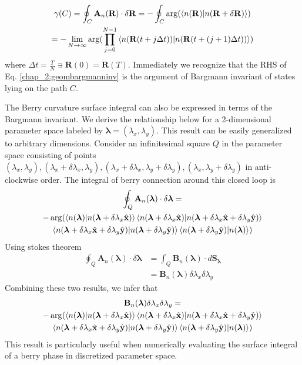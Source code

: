 \begin{multline}
 \label{chap_2:geombargmanninv}\gamma(C) = \oint_{C}{\mathbf{A}_{n}(\mathbf{R}) \cdot \delta\mathbf{R}}  = -\oint_{C}{\arg(\braket{n(\mathbf{R})|n(\mathbf{R} +\delta\mathbf{R})})} \\ = -\lim_{N\rightarrow\infty} \arg(\prod_{j=0}^{N-1}{\braket{n(\mathbf{R}(t + j\Delta t))|n(\mathbf{R}(t + (j+1)\Delta t))}})
\end{multline} where $\Delta t = \frac{T}{N} \ni \mathbf{R}(0)=\mathbf{R}(T)$.
Immediately we recognize that the RHS of Eq. \eqref{chap_2:geombargmanninv} is the argument of Bargmann invariant of states lying on the path $C$.

The Berry curvature surface integral can also be expressed in terms of the Bargmann invariant. We derive the relationship below for a 2-dimensional parameter space
labeled by $\bm{\lambda} = (\lambda_x, \lambda_y)$. This result can be easily generalized to arbitrary dimensions. Consider an infinitesimal square $Q$ in the parameter space 
consisting of points $(\lambda_x, \lambda_y), (\lambda_x + \delta\lambda_x, \lambda_y), (\lambda_x + \delta\lambda_x, \lambda_y + \delta\lambda_y), (\lambda_x, \lambda_y+\delta\lambda_y)$
in anti-clockwise order. The integral of berry connection around this closed loop is
\begin{multline*}
  \oint_{Q}{\mathbf{A}_{n}(\bm{\lambda})\cdot \delta\bm{\lambda}} = \\
  -\arg(\braket{n(\bm{\lambda})|n(\bm{\lambda} + \delta\lambda_x \hat{\mathbf{x}})}\braket{n(\bm{\lambda} + \delta\lambda_x \hat{\mathbf{x}})|n(\bm{\lambda} + \delta\lambda_x \hat{\mathbf{x}} + \delta\lambda_y \hat{\mathbf{y}})}\\ \braket{n(\bm{\lambda} + \delta\lambda_x \hat{\mathbf{x}} + \delta\lambda_y \hat{\mathbf{y}})|n(\bm{\lambda} + \delta\lambda_y \hat{\mathbf{y}})}\braket{n(\bm{\lambda} + \delta\lambda_y \hat{\mathbf{y}})|n(\bm{\lambda})})
\end{multline*}
Using stokes theorem
\begin{align*}
  \oint_{Q}{\mathbf{A}_{n}(\bm{\lambda})\cdot \delta\bm{\lambda}} &= \int_{Q}{\mathbf{B}_{n}(\bm{\lambda})\cdot d\mathbf{S}_{\bm{\lambda}}}\\
  &= \mathbf{B}_{n}(\bm{\lambda}) \delta\lambda_x\delta\lambda_y
\end{align*}
Combining these two results, we infer that\cite{rasta2016geometry}
\begin{multline}
 \mathbf{B}_{n}(\bm{\lambda}) \delta\lambda_x\delta\lambda_y = \\
 -\arg(\braket{n(\bm{\lambda})|n(\bm{\lambda} + \delta\lambda_x \hat{\mathbf{x}})}\braket{n(\bm{\lambda} + \delta\lambda_x \hat{\mathbf{x}})|n(\bm{\lambda} + \delta\lambda_x \hat{\mathbf{x}} + \delta\lambda_y \hat{\mathbf{y}})}\\ \braket{n(\bm{\lambda} + \delta\lambda_x \hat{\mathbf{x}} + \delta\lambda_y \hat{\mathbf{y}})|n(\bm{\lambda} + \delta\lambda_y \hat{\mathbf{y}})}\braket{n(\bm{\lambda} + \delta\lambda_y \hat{\mathbf{y}})|n(\bm{\lambda})})
\end{multline}
This result is particularly useful when numerically evaluating the surface integral of a berry phase in discretized parameter space.


